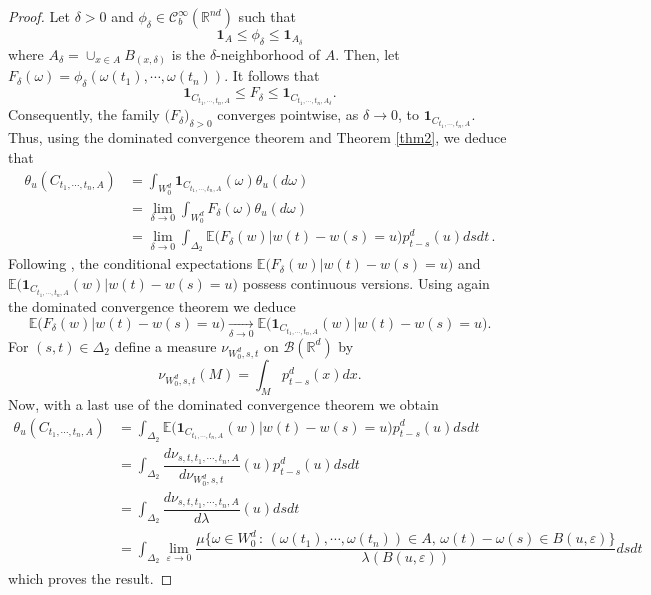 \documentclass[]{interact}
\newcommand{\E}{{\mathbb{E}}}
\newcommand{\R}{{\mathbb{R}}}
\newcommand{\1}{\mathbf{1}}
\newcommand{\ve}{\varepsilon}
\theoremstyle{plain}%
\theoremstyle{definition}
\theoremstyle{remark}
\begin{document}
\begin{proof} Let $\delta>0$ and $\phi_{\delta} \in \mathcal{C}_b^{\infty} (\R^{nd}) $ such that 
$$ \mathbf{1}_{A} \leqslant \phi_\delta \leqslant \mathbf{1}_{A_\delta} $$
where $A_{\delta}=\cup _{x\in A} B_{(x, \delta)}$ is the $\delta$-neighborhood of $A$. Then, let $F_{\delta}(\omega)=\phi_{\delta} (\omega (t_1),\cdots, \omega(t_n) )$. It follows that 
$$ \mathbf{1}_{C_{t_1,\cdots,t_n,A} } \leqslant F_\delta \leqslant \mathbf{1}_{C_{t_1,\cdots,t_n,A_{\delta}}}. $$
Consequently, the family $\big( F_\delta \big) _{\delta >0}$ converges pointwise, as $\delta \to 0$, to $\mathbf{1}_{C_{t_1,\cdots,t_n,A} }$. Thus, using the dominated convergence theorem and Theorem \ref{thm2}, we deduce that 
\begin{align*}
\theta_u(C_{t_1,\cdots,t_n,A})
&=\int_{W_0^d  } \mathbf{1}_{C_{t_1,\cdots,t_n,A}}(\omega) \theta_{u} (d\omega) \\
&=\lim _{\delta \to 0} \int_{W_0^d  } F_{\delta}(\omega) \theta_{u} (d\omega)\\
&=\lim _{\delta \to 0} \int_{\Delta_2  } \E \big(F_{\delta}(w)\big | w(t)-w(s)=u\big)p_{t-s}^d(u)dsdt \,.
\end{align*}
Following \cite{DS23}, the conditional expectations $\E \big(F_{\delta}(w)\big | w(t)-w(s)=u\big)$ and $\E \big(\mathbf{1}_{C_{t_1,\cdots,t_n,A}}(w)\big | w(t)-w(s)=u\big)$ possess continuous versions. Using again the dominated convergence theorem we deduce
$$ \E \big(F_{\delta}(w)\big | w(t)-w(s)=u\big) \xrightarrow[ \delta \to 0]{} \E \big(\mathbf{1}_{C_{t_1,\cdots,t_n,A}}(w)\big | w(t)-w(s)=u\big). $$
For $(s,t)\in \Delta_2$ define a measure $ \nu_{W_0^d,s,t} $ on $\mathcal{B}(\R^d)$ by 
$$ \nu_{W_0^d,s,t}(M)=\int_M p_{t-s}^d(x)dx. $$
Now, with a last use of the dominated convergence theorem we obtain 
\begin{align*}
\theta_u(C_{t_1,\cdots,t_n,A})
&=\int_{\Delta_2  } \E \big(\mathbf{1}_{C_{t_1,\cdots,t_n,A}}(w)\big | w(t)-w(s)=u\big)p_{t-s}^d(u)dsdt \\
&=\int_{\Delta_2  } \dfrac{ d\nu_{s,t,t_1,\cdots,t_n,A}}{d\nu_{W_0^d,s,t}} (u)p_{t-s}^d(u)dsdt \\
&=\int_{\Delta_2  } \dfrac{ d\nu_{s,t,t_1,\cdots,t_n,A}}{d\lambda} (u)dsdt \\
&=\int_{\Delta_2  } \lim_{\ve \to 0} \dfrac{ \mu \big\{ \omega \in W_0^d\, :\,  (\omega (t_1),\cdots,\omega(t_n))\in A, \, \omega(t)-\omega(s)\in B(u,\ve)\big\} }{ \lambda (B(u,\ve)) } dsdt 
\end{align*}
which proves the result.
\end{proof}
\end{document}
